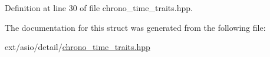 Definition at line 30 of file chrono\+\_\+time\+\_\+traits.\+hpp.



The documentation for this struct was generated from the following file\+:\begin{DoxyCompactItemize}
\item 
ext/asio/detail/\hyperlink{chrono__time__traits_8hpp}{chrono\+\_\+time\+\_\+traits.\+hpp}\end{DoxyCompactItemize}
